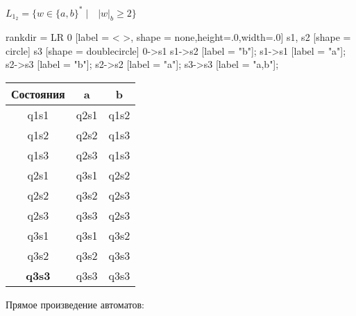 \documentclass{article}
\begin{document}
\begin{center}
$L_1_2 = \{w \in \{ a,b \}^* \; | \quad |w|_b \geq 2 \}$


 {
    rankdir = LR
    0 [label = < >, shape = none,height=.0,width=.0]
    s1, s2 [shape = circle]
    s3 [shape = doublecircle]
    0->s1
    s1->s2 [label = "b"];
    s1->s1 [label = "a"];
    s2->s3 [label = "b"];
    s2->s2 [label = "a"];
    s3->s3 [label = "a,b"];
}


 \begin{tabular}{|c|c|c|}
            \hline
            Состояния & a & b \\
            \hline
            q1s1 & q2s1 & q1s2\\
            q1s2 & q2s2 & q1s3\\
            q1s3 & q2s3 & q1s3\\
            q2s1 & q3s1 & q2s2\\
            q2s2 & q3s2 & q2s3\\
            q2s3 & q3s3 & q2s3\\
            q3s1 & q3s1 & q3s2\\
            q3s2 & q3s2 & q3s3\\
            \textbf{q3s3} & q3s3 & q3s3\\
            \hline
\end{tabular}
\newline
\end{center}

Прямое произведение автоматов:
\end{document}

